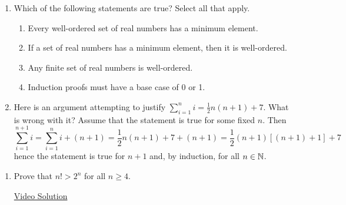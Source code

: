 \pagestyle{empty}


\begin{enumerate}
	\item Which of the following statements are true? Select all that apply.
	\begin{enumerate}
    \item Every well-ordered set of real numbers has a minimum element.
    \item If a set of real numbers has a minimum element, then it is well-ordered.
    \item Any finite set of real numbers is well-ordered.
    \item Induction proofs must have a base case of 0 or 1.
	\end{enumerate}
	
	
	\item Here is an argument attempting to justify $\sum\limits_{i=1}^ni=\frac 12n(n+1)+7$. What is wrong with it?\smallbreak
	Assume that the statement is true for some fixed $n$. Then
	\[
		\sum_{i=1}^{n+1}i=\sum_{i=1}^ni+(n+1)=\frac 12n(n+1)+7+(n+1)=\frac 12(n+1)[(n+1)+1]+7
	\]
	hence the statement is true for $n+1$ and, by induction, for all $n\in\mathbb{N}$.


\end{enumerate}



\begin{enumerate}
	\item Prove that $n!>2^n$ for all $n \ge 4$.

	\href{https://youtu.be/xt3AgzI59LU}{Video Solution}


\end{enumerate}

